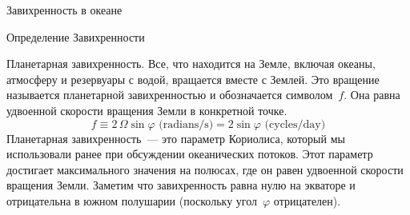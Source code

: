 \begin{chapter}{Завихренность в океане}
\begin{section}{Определение Завихренности}
\begin{paragraph}{Планетарная завихренность.}
Все, что находится на Земле, включая океаны, атмосферу и резервуары с
водой, вращается вместе с Землей. Это вращение называется планетарной
завихренностью и обозначается символом~$f$. Она равна удвоенной скорости
вращения Земли в конкретной точке.
\begin{equation}
\boxed{f \equiv 2\,\Omega \sin \varphi \,\, \text{(radians/s)} 
  = 2 \sin \varphi \,\, \text{(cycles/day)}}
\end{equation}
Планетарная завихренность~--- это параметр Кориолиса, который мы
использовали ранее при обсуждении океанических потоков. Этот параметр
достигает максимального значения на полюсах, где он равен удвоенной
скорости вращения Земли. Заметим что завихренность равна нулю на
экваторе и отрицательна в южном полушарии (поскольку угол~$\varphi$
отрицателен).
%
\end{paragraph}


\end{section}
\end{chapter}
